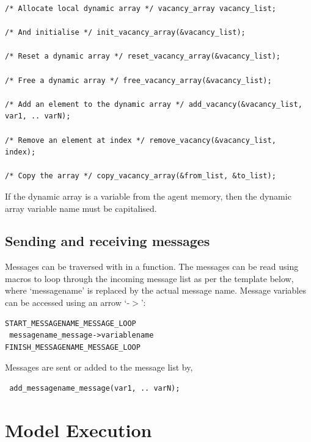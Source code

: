 \documentclass[a4paper,11pt]{article}
\newenvironment{mylisting}
{\begin{list}{}{\setlength{\leftmargin}{1em}}\item\small\bfseries}
{\end{list}}
\begin{document}
\begin{mylisting}
\begin{verbatim}
/* Allocate local dynamic array */ vacancy_array vacancy_list;

/* And initialise */ init_vacancy_array(&vacancy_list);

/* Reset a dynamic array */ reset_vacancy_array(&vacancy_list);

/* Free a dynamic array */ free_vacancy_array(&vacancy_list);

/* Add an element to the dynamic array */ add_vacancy(&vacancy_list,
var1, .. varN);

/* Remove an element at index */ remove_vacancy(&vacancy_list,
index);

/* Copy the array */ copy_vacancy_array(&from_list, &to_list);
\end{verbatim}
\end{mylisting}

If the dynamic array is a variable from the agent memory, then the
dynamic array variable name must be capitalised.

\subsection{Sending and receiving messages}

Messages can be traversed with in a function. The messages can be
read using macros to loop through the incoming message list as per
the template below, where `messagename' is replaced by the actual
message name. Message variables can be accessed using an arrow
`-$>$':

\begin{mylisting}
\begin{verbatim}
START_MESSAGENAME_MESSAGE_LOOP
 messagename_message->variablename
FINISH_MESSAGENAME_MESSAGE_LOOP
\end{verbatim}
\end{mylisting}

Messages are sent or added to the message list by,
\begin{mylisting}
\begin{verbatim}
 add_messagename_message(var1, .. varN);
\end{verbatim}
\end{mylisting}


\section{Model Execution}
\label{model_execution}
\end{document}
